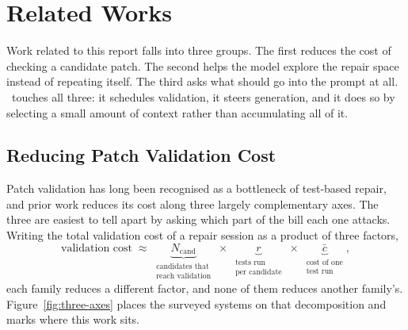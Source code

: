 \chapter{Related Works}
\label{ch:related}

Work related to this report falls into three groups. The first reduces the cost
of checking a candidate patch. The second helps the model explore the repair
space instead of repeating itself. The third asks what should go into the prompt
at all. \caster\ touches all three: it schedules validation, it steers
generation, and it does so by selecting a small amount of context rather than
accumulating all of it.

\section{Reducing Patch Validation Cost}
\label{sec:rel-validation}

Patch validation has long been recognised as a bottleneck of test-based repair,
and prior work reduces its cost along three largely complementary axes. The
three are easiest to tell apart by asking which part of the bill each one
attacks. Writing the total validation cost of a repair session as a product of
three factors,
\begin{equation}
\text{validation cost} \;\approx\;
\underbrace{N_{\text{cand}}}_{\substack{\text{candidates that}\\ \text{reach validation}}}
\;\times\;
\underbrace{r}_{\substack{\text{tests run}\\ \text{per candidate}}}
\;\times\;
\underbrace{\bar{c}}_{\substack{\text{cost of one}\\ \text{test run}}},
\label{eq:three-factors}
\end{equation}
each family reduces a different factor, and none of them reduces another
family's. Figure~\ref{fig:three-axes} places the surveyed systems on that
decomposition and marks where this work sits.

